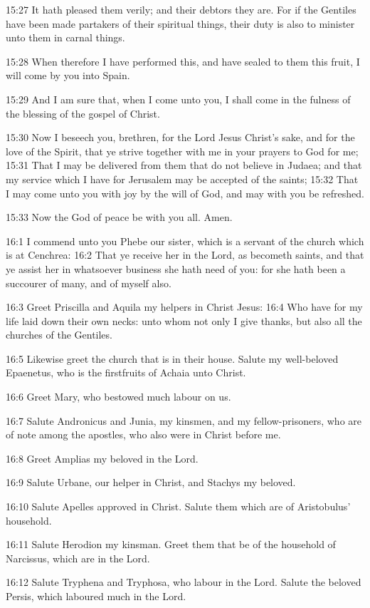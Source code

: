 15:27 It hath pleased them verily; and their debtors they are. For if
the Gentiles have been made partakers of their spiritual things, their
duty is also to minister unto them in carnal things.

15:28 When therefore I have performed this, and have sealed to them
this fruit, I will come by you into Spain.

15:29 And I am sure that, when I come unto you, I shall come in the
fulness of the blessing of the gospel of Christ.

15:30 Now I beseech you, brethren, for the Lord Jesus Christ's sake,
and for the love of the Spirit, that ye strive together with me in
your prayers to God for me; 15:31 That I may be delivered from them
that do not believe in Judaea; and that my service which I have for
Jerusalem may be accepted of the saints; 15:32 That I may come unto
you with joy by the will of God, and may with you be refreshed.

15:33 Now the God of peace be with you all. Amen.

16:1 I commend unto you Phebe our sister, which is a servant of the
church which is at Cenchrea: 16:2 That ye receive her in the Lord, as
becometh saints, and that ye assist her in whatsoever business she
hath need of you: for she hath been a succourer of many, and of myself
also.

16:3 Greet Priscilla and Aquila my helpers in Christ Jesus: 16:4 Who
have for my life laid down their own necks: unto whom not only I give
thanks, but also all the churches of the Gentiles.

16:5 Likewise greet the church that is in their house. Salute my
well-beloved Epaenetus, who is the firstfruits of Achaia unto Christ.

16:6 Greet Mary, who bestowed much labour on us.

16:7 Salute Andronicus and Junia, my kinsmen, and my fellow-prisoners,
who are of note among the apostles, who also were in Christ before me.

16:8 Greet Amplias my beloved in the Lord.

16:9 Salute Urbane, our helper in Christ, and Stachys my beloved.

16:10 Salute Apelles approved in Christ. Salute them which are of
Aristobulus' household.

16:11 Salute Herodion my kinsman. Greet them that be of the household
of Narcissus, which are in the Lord.

16:12 Salute Tryphena and Tryphosa, who labour in the Lord. Salute the
beloved Persis, which laboured much in the Lord.


